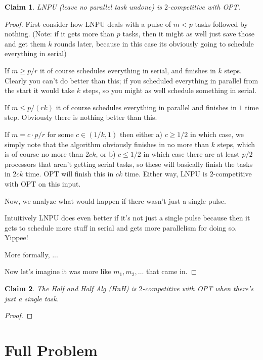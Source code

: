 \documentclass{article}[11pt]
\newtheorem{clm}{Claim}
\begin{document}
\begin{clm}
  LNPU (leave no parallel task undone) is $2$-competitive with
  OPT.
\end{clm}
\begin{proof}
  First consider how LNPU deals with a pulse of $m < p$ tasks
  followed by nothing. (Note: if it gets more than $p$ tasks,
  then it might as well just save those and get them $k$ rounds
  later, because in this case its obviously going to schedule
  everything in serial)

  If $m \ge p/r$ it of course schedules everything in serial, and
  finishes in $k$ steps. Clearly you can't do better than this;
  if you scheduled everything in parallel from the start it would
  take $k$ steps, so you might as well schedule something in
  serial.

  If $m\le p/(rk)$ it of course schedules everything in parallel
  and finishes in $1$ time step. Obviously there is nothing
  better than this.

  If $m = c\cdot p/r $ for some $c\in (1/k, 1)$ then either a)
  $c\ge 1/2$ in which case, we simply note that the algorithm
  obviously finishes in no more than $k$ steps, which is of
  course no more than $2ck$, or b) $c\le 1/2$
  in which case there are at least $p/2$ processors that aren't
  getting serial tasks, so these will basically finish the tasks
  in $2ck$ time. OPT will finish this in $ck$ time. Either way,
  LNPU is $2$-competitive with OPT on this input.

  Now, we analyze what would happen if there wasn't just a single
  pulse. 

  Intuitively LNPU does even better if it's not just a single
  pulse because then it gets to schedule more stuff in serial and
  gets more parallelism for doing so. Yippee!

  More formally, ...

  Now let's imagine it was more like $m_1, m_2, \ldots$ that came
  in. 

 
\end{proof}

\begin{clm}
  The Half and Half Alg (HnH) is $2$-competitive with OPT when
  there's just a single task.
\end{clm}
\begin{proof}
  
\end{proof}


\section{Full Problem}
\end{document}
